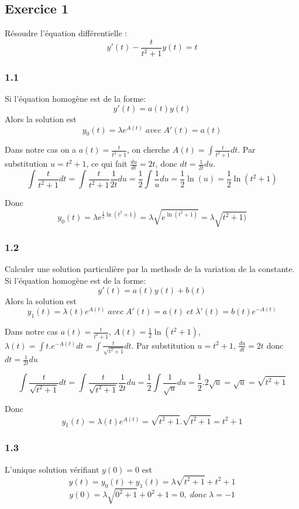 \documentclass[]{book}
\theoremstyle{definition}
\begin{document}
\newpage

\subsection*{Exercice 1}
R\'esoudre l'\'equation diff\'erentielle :
$$y'(t) - \frac{t}{t^2+1}y(t) = t$$

\subsubsection*{1.1}
Si l'\'equation homog\`ene est de la forme:
$$y'(t) = a(t)y(t)$$
Alors la solution est
$$y_0(t) = \lambda e^{A(t)}\; avec\; A'(t) = a(t)$$

Dans notre cas on a $a(t) = \frac{t}{t^2+1}$, on cherche $A(t) = \int{\frac{t}{t^2+1}dt}$.
Par substitution $u = t^2 +1$, ce qui fait $\frac{du}{dt} = 2t$, donc $dt = \frac{1}{2t}du$.
$$\int{\frac{t}{t^2+1}dt} = \int{\frac{t}{t^2+1}\frac{1}{2t}du} = \frac{1}{2}\int{\frac{1}{u}du} = \frac{1}{2}\ln(u) = \frac{1}{2}\ln(t^2+1)$$

Donc
$$y_0(t) = \lambda e^{\frac{1}{2}\ln(t^2+1)} = \lambda \sqrt{e^{\ln(t^2+1)}} = \lambda \sqrt{t^2+1)}$$

\subsubsection*{1.2}
Calculer une solution particuli\`ere par la methode de la variation de la constante.
Si l'\'equation homog\`ene est de la forme:
$$y'(t) = a(t)y(t) + b(t)$$
Alors la solution est
$$y_1(t) = \lambda(t) e^{A(t)}\; avec\; A'(t) = a(t)\; et\; \lambda'(t) = b(t)e^{-A(t)}$$

Dans notre cas $a(t) = \frac{t}{t^2+1}$, $A(t) = \frac{1}{2}\ln(t^2+1)$, $\lambda(t) = \int{t.e^{-A(t)}dt} = \int{\frac{t}{\sqrt{t^2+1}}dt}$.
Par substitution $u = t^2+1$, $\frac{du}{dt} = 2t$ donc $dt = \frac{1}{2t}du$

$$\int{\frac{t}{\sqrt{t^2+1}}dt} = \int{\frac{t}{\sqrt{t^2+1}}\frac{1}{2t}du} = \frac{1}{2}\int{\frac{1}{\sqrt{u}}du} = \frac{1}{2}.2\sqrt{u} = \sqrt{u} = \sqrt{t^2+1}$$

Donc
$$y_1(t) = \lambda(t) e^{A(t)} = \sqrt{t^2+1} . \sqrt{t^2+1} = t^2+1$$

\subsubsection*{1.3}
L'unique solution v\'erifiant $y(0)= 0$ est
$$y(t) = y_0(t) + y_1(t) = \lambda\sqrt{t^2+1} + t^2+1$$
$$y(0) = \lambda\sqrt{0^2+1} + 0^2+1 = 0,\; donc\; \lambda = -1$$
\end{document}

